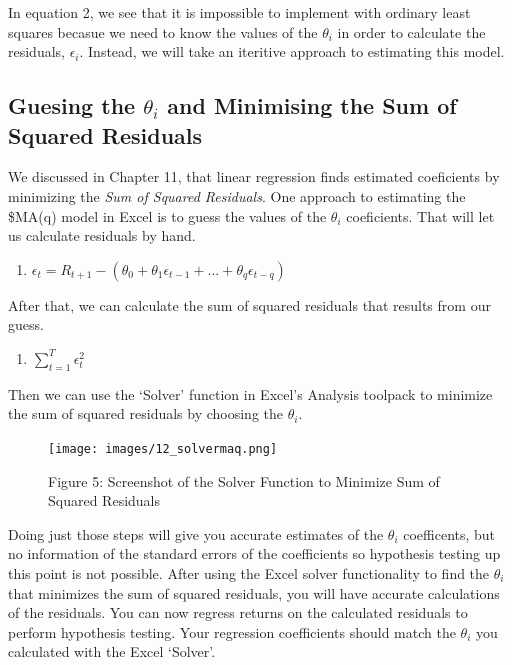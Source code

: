 \documentclass[
]{book}
\providecommand{\tightlist}{%
  \setlength{\itemsep}{0pt}\setlength{\parskip}{0pt}}
\begin{document}
In equation 2, we see that it is impossible to implement with ordinary least squares becasue we need to know the values of the \(\theta_i\) in order to calculate the residuals, \(\epsilon_i\). Instead, we will take an iteritive approach to estimating this model.

\hypertarget{guesing-the-theta_i-and-minimising-the-sum-of-squared-residuals}{%
\subsection{\texorpdfstring{Guesing the \(\theta_i\) and Minimising the Sum of Squared Residuals}{Guesing the \textbackslash theta\_i and Minimising the Sum of Squared Residuals}}\label{guesing-the-theta_i-and-minimising-the-sum-of-squared-residuals}}

We discussed in Chapter 11, that linear regression finds estimated coeficients by minimizing the \emph{Sum of Squared Residuals}. One approach to estimating the \$MA(q) model in Excel is to guess the values of the \(\theta_i\) coeficients. That will let us calculate residuals by hand.

\begin{enumerate}
\def\labelenumi{\arabic{enumi}.}
\setcounter{enumi}{2}
\tightlist
\item
  \(\epsilon_{t} = R_{t+1} - (\theta_0 + \theta_1\epsilon_{t-1} + ... + \theta_q\epsilon_{t-q})\)
\end{enumerate}

After that, we can calculate the sum of squared residuals that results from our guess.

\begin{enumerate}
\def\labelenumi{\arabic{enumi}.}
\setcounter{enumi}{3}
\tightlist
\item
  \(\sum_{t=1}^{T} \epsilon_t^2\)
\end{enumerate}

Then we can use the `Solver' function in Excel's Analysis toolpack to minimize the sum of squared residuals by choosing the \(\theta_i\).

\begin{figure}
\centering
\texttt{[image: images/12\_solvermaq.png]}
\caption{Figure 5: Screenshot of the Solver Function to Minimize Sum of Squared Residuals}
\end{figure}

Doing just those steps will give you accurate estimates of the \(\theta_i\) coefficents, but no information of the standard errors of the coefficients so hypothesis testing up this point is not possible. After using the Excel solver functionality to find the \(\theta_i\) that minimizes the sum of squared residuals, you will have accurate calculations of the residuals. You can now regress returns on the calculated residuals to perform hypothesis testing. Your regression coefficients should match the \(\theta_i\) you calculated with the Excel `Solver'.
\end{document}
